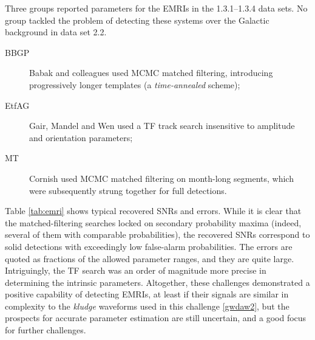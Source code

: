 \documentclass{iopart}
\begin{document}
Three groups reported parameters for the EMRIs in the 1.3.1--1.3.4 data sets. No group tackled the problem of detecting these systems over the Galactic background in data set 2.2.
%
\begin{description}
\item[BBGP] Babak and colleagues used MCMC matched filtering, introducing progressively longer templates (a \emph{time-annealed} scheme);
%
\item[EtfAG] Gair, Mandel and Wen used a TF track search insensitive to amplitude and orientation parameters;
%
\item[MT] Cornish used MCMC matched filtering on month-long segments, which were subsequently strung together for full detections.
\end{description}
%
Table \ref{tab:emri} shows typical recovered SNRs and errors. While it is clear that the matched-filtering searches locked on secondary probability maxima (indeed, several of them with comparable probabilities), the recovered SNRs correspond to solid detections with exceedingly low false-alarm probabilities. The errors are quoted as fractions of the allowed parameter ranges, and they are quite large. Intriguingly, the TF search was an order of magnitude more precise in determining the intrinsic parameters. Altogether, these challenges demonstrated a positive capability of detecting EMRIs, at least if their signals are similar in complexity to the \emph{kludge} waveforms used in this challenge \ref{gwdaw2}, but the prospects for accurate parameter estimation are still uncertain, and a good focus for further challenges.
%
\end{document}
